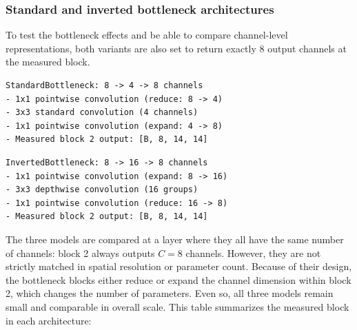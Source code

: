 \documentclass[12pt,a4paper]{report}
\begin{document}
\subsubsection{Standard and inverted bottleneck architectures}
To test the bottleneck effects and be able to compare channel-level representations, both variants are also set to return exactly 8 output channels at the measured block.

\begin{verbatim}
StandardBottleneck: 8 -> 4 -> 8 channels
- 1x1 pointwise convolution (reduce: 8 -> 4)
- 3x3 standard convolution (4 channels)
- 1x1 pointwise convolution (expand: 4 -> 8)
- Measured block 2 output: [B, 8, 14, 14]
\end{verbatim}

\begin{verbatim}
InvertedBottleneck: 8 -> 16 -> 8 channels
- 1x1 pointwise convolution (expand: 8 -> 16)
- 3x3 depthwise convolution (16 groups)
- 1x1 pointwise convolution (reduce: 16 -> 8)
- Measured block 2 output: [B, 8, 14, 14]
\end{verbatim}

The three models are compared at a layer where they all have the same number of channels: block 2 always outputs \(C = 8\) channels. However, they are not strictly matched in spatial resolution or parameter count. Because of their design, the bottleneck blocks either reduce or expand the channel dimension within block 2, which changes the number of parameters. Even so, all three models remain small and comparable in overall scale. This table summarizes the measured block in each architecture:

\begin{table}[ht]
\centering
{}
\caption{Architecture summary for the measured second block.}
\label{tab:architectures}
\end{table}
\end{document}
